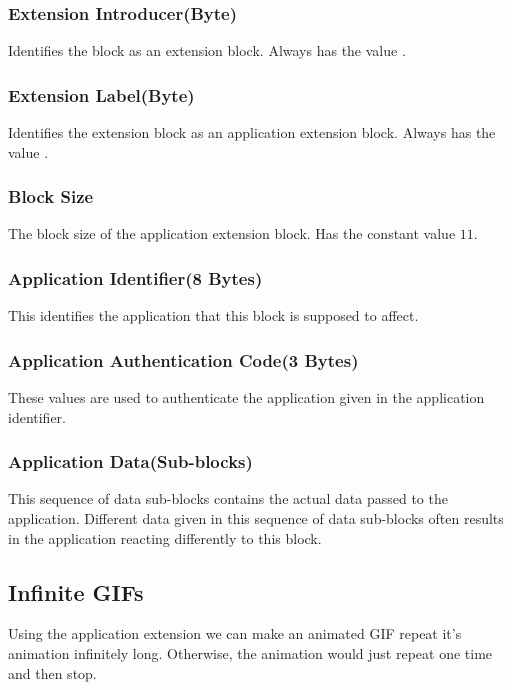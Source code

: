 \subsubsection{Extension Introducer(Byte)}

Identifies the block as an extension block. Always has the value
.

\subsubsection{Extension Label(Byte)}

Identifies the extension block as an application extension
block. Always has the value .

\subsubsection{Block Size}

The block size of the application extension block. Has the constant
value $11$.

\subsubsection{Application Identifier(8 Bytes)}

This identifies the application that this block is supposed to
affect.

\subsubsection{Application Authentication Code(3 Bytes)}

These values are used to authenticate the application given in the
application identifier.

\subsubsection{Application Data(Sub-blocks)}

This sequence of data sub-blocks contains the actual data passed to
the application. Different data given in this sequence of data
sub-blocks often results in the application reacting differently to
this block.

\subsection{Infinite GIFs}

Using the application extension we can make an animated GIF repeat
it's animation infinitely long. Otherwise, the animation would just
repeat one time and then stop.

